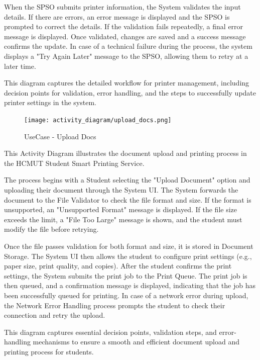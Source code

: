 \documentclass[a4paper]{report}
\begin{document}
When the SPSO submits printer information, the System validates the input details. If there are errors, an error message is displayed and the SPSO is prompted to correct the details. If the validation fails repeatedly, a final error message is displayed. Once validated, changes are saved and a success message confirms the update. In case of a technical failure during the process, the system displays a "Try Again Later" message to the SPSO, allowing them to retry at a later time.

This diagram captures the detailed workflow for printer management, including decision points for validation, error handling, and the steps to successfully update printer settings in the system.


\begin{figure}[H]
    \centering
    \texttt{[image: activity\_diagram/upload\_docs.png]}
    \caption{UseCase - Upload Docs}
\end{figure}
This Activity Diagram illustrates the document upload and printing process in the HCMUT Student Smart Printing Service. 

The process begins with a Student selecting the "Upload Document" option and uploading their document through the System UI. The System forwards the document to the File Validator to check the file format and size. If the format is unsupported, an "Unsupported Format" message is displayed. If the file size exceeds the limit, a "File Too Large" message is shown, and the student must modify the file before retrying.

Once the file passes validation for both format and size, it is stored in Document Storage. The System UI then allows the student to configure print settings (e.g., paper size, print quality, and copies). After the student confirms the print settings, the System submits the print job to the Print Queue.
The print job is then queued, and a confirmation message is displayed, indicating that the job has been successfully queued for printing. In case of a network error during upload, the Network Error Handling process prompts the student to check their connection and retry the upload.

This diagram captures essential decision points, validation steps, and error-handling mechanisms to ensure a smooth and efficient document upload and printing process for students.
\end{document}

